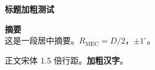 \documentclass[11pt,a4paper]{article}
\begin{document}
{\sffamily\bfseries\Large 标题加粗测试}

\begin{center}
{\sffamily\bfseries\large 摘要}\\[0.4em]
这是一段居中摘要。$R_{\mathrm{MEC}}=D/2$，$\pm 1^{\circ}$。
\end{center}

正文宋体 1.5 倍行距。\textbf{加粗汉字}。
\end{document}
